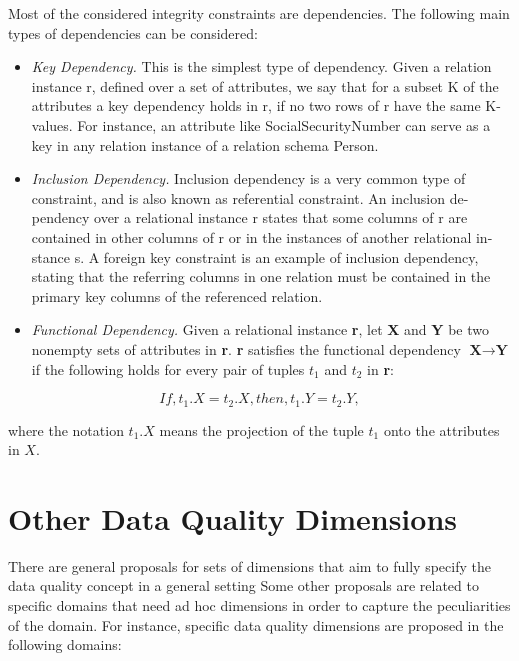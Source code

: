Most of the considered integrity constraints are dependencies. The following main types of dependencies can be considered:

\begin{itemize}
    \item{\textit{Key Dependency.} This is the simplest type of dependency. Given a relation
    instance r, defined over a set of attributes, we say that for a subset K of
    the attributes a key dependency holds in r, if no two rows of r have the
    same K-values. For instance, an attribute like SocialSecurityNumber can
    serve as a key in any relation instance of a relation schema Person.}
    \item{\textit{Inclusion Dependency.} Inclusion dependency is a very common type of
    constraint, and is also known as referential constraint. An inclusion de-
    pendency over a relational instance r states that some columns of r are
    contained in other columns of r or in the instances of another relational in-
    stance s. A foreign key constraint is an example of inclusion dependency,
    stating that the referring columns in one relation must be contained in the
    primary key columns of the referenced relation.}
    \item{\textit{Functional Dependency.} Given a relational instance \textbf{r}, let \textbf{X} and \textbf{Y} be two
    nonempty sets of attributes in \textbf{r}. \textbf{r} satisfies the functional dependency
    ${\textbf{X} \rightarrow \textbf{Y}}$ if the following holds for every pair of tuples \textbf{$t_1$} and \textbf{$t_2$} in \textbf{r}:
    }
\end{itemize}

\begin{equation*}
    \boxed{If, t_1.X = t_2.X, then, t_1.Y = t_2.Y,}
\end{equation*}

where the notation $t_1.X$ means the projection of the tuple $t_1$ onto the
attributes in $X$.

\section{Other Data Quality Dimensions}
There are general proposals for sets of dimensions that aim to fully specify
the data quality concept in a general setting Some other
proposals are related to specific domains that need ad hoc dimensions in order
to capture the peculiarities of the domain. For instance, specific data quality
dimensions are proposed in the following domains:

